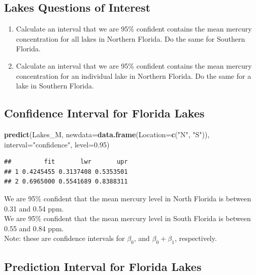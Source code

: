 \documentclass[]{book}
\newenvironment{Shaded}{\begin{snugshade}}{\end{snugshade}}
\newcommand{\KeywordTok}[1]{\textcolor[rgb]{0.13,0.29,0.53}{\textbf{#1}}}
\newcommand{\DataTypeTok}[1]{\textcolor[rgb]{0.13,0.29,0.53}{#1}}
\newcommand{\FloatTok}[1]{\textcolor[rgb]{0.00,0.00,0.81}{#1}}
\newcommand{\StringTok}[1]{\textcolor[rgb]{0.31,0.60,0.02}{#1}}
\newcommand{\NormalTok}[1]{#1}
\begin{document}
\subsection{Lakes Questions of
Interest}\label{lakes-questions-of-interest}

\begin{enumerate}
\def\labelenumi{\arabic{enumi}.}
\item
  Calculate an interval that we are 95\% confident contains the mean
  mercury concentration for all lakes in Northern Florida. Do the same
  for Southern Florida.
\item
  Calculate an interval that we are 95\% confident contains the mean
  mercury concentration for an individual lake in Northern Florida. Do
  the same for a lake in Southern Florida.
\end{enumerate}

\subsection{Confidence Interval for Florida
Lakes}\label{confidence-interval-for-florida-lakes}

\begin{Shaded}
\begin{Highlighting}[]
\KeywordTok{predict}\NormalTok{(Lakes_M, }\DataTypeTok{newdata=}\KeywordTok{data.frame}\NormalTok{(}\DataTypeTok{Location=}\KeywordTok{c}\NormalTok{(}\StringTok{"N"}\NormalTok{, }\StringTok{"S"}\NormalTok{)), }\DataTypeTok{interval=}\StringTok{"confidence"}\NormalTok{, }\DataTypeTok{level=}\FloatTok{0.95}\NormalTok{)}
\end{Highlighting}
\end{Shaded}

\begin{verbatim}
##         fit       lwr       upr
## 1 0.4245455 0.3137408 0.5353501
## 2 0.6965000 0.5541689 0.8388311
\end{verbatim}

We are 95\% confident that the mean mercury level in North Florida is
between 0.31 and 0.54 ppm.\\
We are 95\% confident that the mean mercury level in South Florida is
between 0.55 and 0.84 ppm.\\
Note: these are confidence intervals for \(\beta_0\), and
\(\beta_0 + \beta_1\), respectively.

\subsection{Prediction Interval for Florida
Lakes}\label{prediction-interval-for-florida-lakes}
\end{document}
